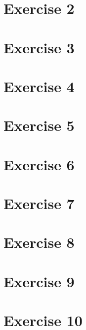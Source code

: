 \documentclass[twoside, a4paper, fleqn, reqno]{article}
\begin{document}
\section*{Exercise 2}



\section*{Exercise 3}

\section*{Exercise 4}

\section*{Exercise 5}

\section*{Exercise 6}

\section*{Exercise 7}

\section*{Exercise 8}

\section*{Exercise 9}

\section*{Exercise 10}
\end{document}
